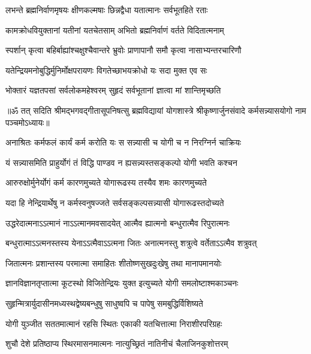 \twolineshloka
{लभन्ते ब्रह्मनिर्वाणमृषयः क्षीणकल्मषाः}
{छिन्नद्वैधा यतात्मानः सर्वभूतहिते रताः}%

\twolineshloka
{कामक्रोधवियुक्तानां यतीनां यतचेतसाम्}
{अभितो ब्रह्मनिर्वाणं वर्तते विदितात्मनाम्}%

\twolineshloka
{स्पर्शान् कृत्वा बहिर्बाह्यांश्चक्षुश्चैवान्तरे भ्रुवोः}
{प्राणापानौ समौ कृत्वा नासाभ्यन्तरचारिणौ}%

\twolineshloka
{यतेन्द्रियमनोबुद्धिर्मुनिर्मोक्षपरायणः}
{विगतेच्छाभयक्रोधो यः सदा मुक्त एव सः}%

\twolineshloka
{भोक्तारं यज्ञतपसां सर्वलोकमहेश्वरम्}
{सुहृदं सर्वभूतानां ज्ञात्वा मां शान्तिमृच्छति}%

{॥ॐ तत् सदिति श्रीमद्भगवद्गीतासूपनिषत्सु ब्रह्मविद्यायां योगशास्त्रे श्रीकृष्णार्जुनसंवादे कर्मसन्न्यासयोगो नाम पञ्चमोऽध्यायः॥}



\twolineshloka
{अनाश्रितः कर्मफलं कार्यं कर्म करोति यः}
{स सन्न्यासी च योगी च न निरग्निर्न चाक्रियः}%

\twolineshloka
{यं सन्न्यासमिति प्राहुर्योगं तं विद्धि पाण्डव}
{न ह्यसन्न्यस्तसङ्कल्पो योगी भवति कश्चन}%

\twolineshloka
{आरुरुक्षोर्मुनेर्योगं कर्म कारणमुच्यते}
{योगारूढस्य तस्यैव शमः कारणमुच्यते}%

\twolineshloka
{यदा हि नेन्द्रियार्थेषु न कर्मस्वनुषज्जते}
{सर्वसङ्कल्पसन्न्यासी योगारूढस्तदोच्यते}%

\twolineshloka
{उद्धरेदात्मनाऽऽत्मानं नाऽऽत्मानमवसादयेत्}
{आत्मैव ह्यात्मनो बन्धुरात्मैव रिपुरात्मनः}%

\twolineshloka
{बन्धुरात्माऽऽत्मनस्तस्य येनाऽऽत्मैवाऽऽत्मना जितः}
{अनात्मनस्तु शत्रुत्वे वर्तेताऽऽत्मैव शत्रुवत्}%

\twolineshloka
{जितात्मनः प्रशान्तस्य परमात्मा समाहितः}
{शीतोष्णसुखदुःखेषु तथा मानापमानयोः}%

\twolineshloka
{ज्ञानविज्ञानतृप्तात्मा कूटस्थो विजितेन्द्रियः}
{युक्त इत्युच्यते योगी समलोष्टाश्मकाञ्चनः}%

\twolineshloka
{सुहृन्मित्रार्युदासीनमध्यस्थद्वेष्यबन्धुषु}
{साधुष्वपि च पापेषु समबुद्धिर्विशिष्यते}%

\twolineshloka
{योगी युञ्जीत सततमात्मानं रहसि स्थितः}
{एकाकी यतचित्तात्मा निराशीरपरिग्रहः}%

\twolineshloka
{शुचौ देशे प्रतिष्ठाप्य स्थिरमासनमात्मनः}
{नात्युच्छ्रितं नातिनीचं चैलाजिनकुशोत्तरम्}%

